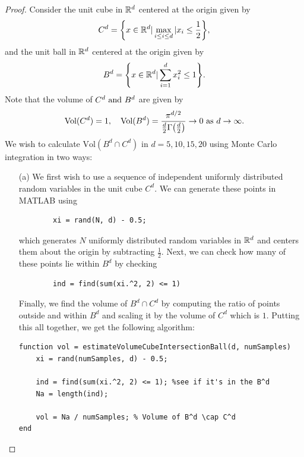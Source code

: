\documentclass[12pt]{report}
\begin{document}
\begin{problem}
\begin{proof}
Consider the unit cube in ${\mathbb R}^d$ centered at the origin given by
\begin{equation*}
    C^d = {\left\{x \in {\mathbb R}^d | \max_{i \leq i \leq d}|x_i \leq \frac{1}{2}\right\}},
\end{equation*}
and the unit ball in ${\mathbb R}^d$ centered at the origin given by
\begin{equation*}
    B^d = {\left\{x \in {\mathbb R}^d | \sum_{i =1}^d x_i^2 \leq 1\right\}}.
\end{equation*}
Note that the volume of $C^d {~\text{and}~} B^d$ are given by
\begin{equation*}
    \text{Vol}(C^d) = 1, \quad \text{Vol}(B^d) = \frac{\pi^{d/2}}{\frac{d}{2}\Gamma{\left(\frac{d}{2}\right)}} \to 0 ~\text{as}~ d\to \infty.
\end{equation*}
We wish to calculate $\text{Vol}(B^d \cap C^d)$ in $d = 5,10,15,20$ using Monte Carlo integration in two ways:
\begin{enumerate}
    \item [(a)] 
    We first wish to use a sequence of independent uniformly distributed random variables in the unit cube $C^d$. We can generate these points in MATLAB using 
    \begin{verbatim}
        xi = rand(N, d) - 0.5;
    \end{verbatim}
    which generates $N$ uniformly distributed random variables in ${\mathbb R}^d$ and centers them about the origin by subtracting $\frac{1}{2}$. Next, we can check how many of these points lie within $B^d$ by checking 
    \begin{verbatim}
        ind = find(sum(xi.^2, 2) <= 1)
    \end{verbatim}
    Finally, we find the volume of $B^d \cap C^d$ by computing the ratio of points outside and within $B^d$ and scaling it by the volume of $C^d$ which is $1$. Putting this all together, we get the following algorithm:
    \begin{lstlisting}[style=Matlab-editor]
function vol = estimateVolumeCubeIntersectionBall(d, numSamples)
    xi = rand(numSamples, d) - 0.5;
    
    ind = find(sum(xi.^2, 2) <= 1); %see if it's in the B^d
    Na = length(ind); 

    vol = Na / numSamples; % Volume of B^d \cap C^d
end
    \end{lstlisting}  



\end{enumerate}
\end{proof}
\end{problem}
\end{document}
